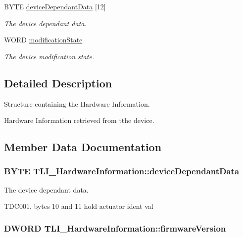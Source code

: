 \begin{DoxyCompactItemize}
B\+Y\+TE \hyperlink{struct_t_l_i___hardware_information_a89b2101a53d42124e37b55c289518869}{device\+Dependant\+Data} \mbox{[}12\mbox{]}
\begin{DoxyCompactList}\small\item\em The device dependant data. \end{DoxyCompactList}\item 
W\+O\+RD \hyperlink{struct_t_l_i___hardware_information_a8a6af93d1f1c64943eaf45cd5f307526}{modification\+State}
\begin{DoxyCompactList}\small\item\em The device modification state. \end{DoxyCompactList}\end{DoxyCompactItemize}


\subsection{Detailed Description}
Structure containing the Hardware Information. 

Hardware Information retrieved from tthe device. 

\subsection{Member Data Documentation}
\subsubsection[{\texorpdfstring{device\+Dependant\+Data}{deviceDependantData}}]{\setlength{\rightskip}{0pt plus 5cm}B\+Y\+TE T\+L\+I\+\_\+\+Hardware\+Information\+::device\+Dependant\+Data}\hypertarget{struct_t_l_i___hardware_information_a89b2101a53d42124e37b55c289518869}{}\label{struct_t_l_i___hardware_information_a89b2101a53d42124e37b55c289518869}


The device dependant data. 

T\+D\+C001, bytes 10 and 11 hold actuator ident val
\subsubsection[{\texorpdfstring{firmware\+Version}{firmwareVersion}}]{\setlength{\rightskip}{0pt plus 5cm}D\+W\+O\+RD T\+L\+I\+\_\+\+Hardware\+Information\+::firmware\+Version}\hypertarget{struct_t_l_i___hardware_information_a853850c73c53b669035d424a89f32f57}{}\label{struct_t_l_i___hardware_information_a853850c73c53b669035d424a89f32f57}


